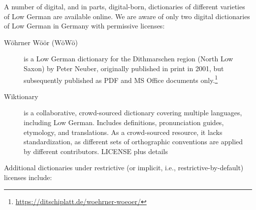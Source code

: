 \documentclass{article}
\begin{document}
A number of digital, and in parts, digital-born, dictionaries of different varieties of Low German are available online. We are aware of only two digital dictionaries of Low German in Germany with permissive licenses:

\begin{description}
\item[Wöhrner Wöör (WöWö)] is a Low German dictionary for the Dithmarschen region (North Low Saxon) by Peter Neuber, originally published in print in 2001, but subsequently published as PDF and MS Office documents only.\footnote{\url{https://ditschiplatt.de/woehrner-woeoer/}}

\item[Wiktionary] is a collaborative, crowd-sourced dictionary covering multiple languages, including Low German. Includes definitions, pronunciation guides, etymology, and translations. As a crowd-sourced resource, it lacks standardization, as different sets of orthographic conventions are applied by different contributors. LICENSE plus details

\end{description}

Additional dictionaries under restrictive (or implicit, i.e., restrictive-by-default) licenses include:
\end{document}
